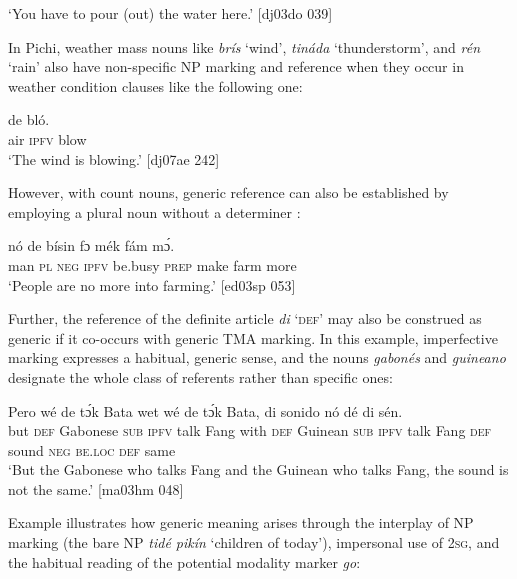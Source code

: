 \glt ‘You have to pour (out) the water here.’ [dj03do 039]
\z

In Pichi, weather mass nouns like \textit{brís} ‘wind’, \textit{tináda} ‘thunderstorm’, and \textit{rén} ‘rain’ also have non-specific NP marking and reference when they occur in weather condition clauses like the following one:


\ea%
    \label{ex:key:226}
    \gll {}  de  bló.\\
air  \textsc{ipfv}  blow\\

\glt ‘The wind is blowing.’ [dj07ae 242]
\z

However, with count nouns, generic reference can also be established by employing a plural noun without a determiner :


\ea%
    \label{ex:key:227}
    \gll {}    nó  de  bísin  fɔ  mék    fám    mɔ́.\\
man    \textsc{pl}  \textsc{neg}  \textsc{ipfv}  be.busy  \textsc{prep}  make  farm  more\\

\glt ‘People are no more into farming.’ [ed03sp 053]
\z

Further, the reference of the definite article \textit{di} ‘\textsc{def’} may also be construed as generic if it co-occurs with generic TMA marking. In this example, imperfective marking expresses a habitual, generic sense, and the nouns \textit{gabonés} and \textit{guineano} designate the whole class of referents rather than specific ones: 


\ea%
    \label{ex:key:228}
    \gll Pero          wé  de  tɔ́k  Bata    wet       
wé  de  tɔ́k   Bata,  di  sonido  nó  dé    di  sén.\\
but    \textsc{def}  Gabonese  \textsc{sub}  \textsc{ipfv}  talk  Fang  with    \textsc{def}  Guinean    
\textsc{sub}  \textsc{ipfv}  talk Fang    \textsc{def}  sound  \textsc{neg}  \textsc{be.loc}  \textsc{def}  same\\

\glt ‘But the Gabonese who talks Fang and the Guinean who talks Fang, the sound is not the same.’ [ma03hm 048]
\z

Example  illustrates how generic meaning arises through the interplay of \textsc{NP} marking (the bare NP \textit{tidé pikín} ‘children of today’), impersonal use of \textsc{2sg}, and the habitual reading of the potential modality marker \textit{go}: 


